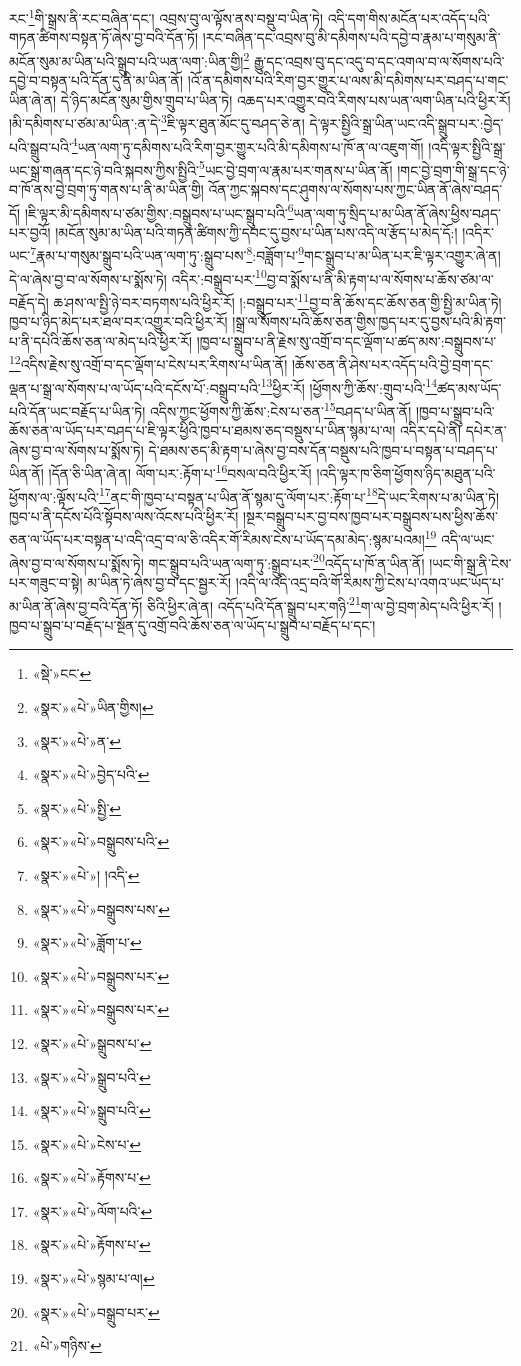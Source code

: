 རང་\footnote{«སྡེ་»ངང་}གི་སྒྲས་ནི་རང་བཞིན་དང་། འབྲས་བུ་ལ་ལྟོས་ནས་བསྡུ་བ་ཡིན་ཏེ། འདི་དག་གིས་མངོན་པར་འདོད་པའི་གཏན་ཚིགས་བསྟན་ཏོ་ཞེས་བྱ་བའི་དོན་ཏོ། །རང་བཞིན་དང་འབྲས་བུ་མི་དམིགས་པའི་དབྱེ་བ་རྣམ་པ་གསུམ་ནི་མངོན་སུམ་མ་ཡིན་པའི་སྒྲུབ་པའི་ཡན་ལག་:ཡིན་གྱི།\footnote{«སྣར་»«པེ་»ཡིན་གྱིས།} རྒྱུ་དང་འབྲས་བུ་དང་འདུ་བ་དང་འགལ་བ་ལ་སོགས་པའི་དབྱེ་བ་བསྟན་པའི་དོན་དུ་ནི་མ་ཡིན་ནོ། །འོ་ན་དམིགས་པའི་རིག་བྱར་གྱུར་པ་ལས་མི་དམིགས་པར་བཤད་པ་གང་ཡིན་ཞེ་ན། དེ་ཉིད་མངོན་སུམ་གྱིས་གྲུབ་པ་ཡིན་ཏེ། འཆད་པར་འགྱུར་བའི་རིགས་པས་ཡན་ལག་ཡིན་པའི་ཕྱིར་རོ། །མི་དམིགས་པ་ཙམ་མ་ཡིན་:ན་དེ་\footnote{«སྣར་»«པེ་»ན་}ཇི་ལྟར་ཐུན་མོང་དུ་བཤད་ཅེ་ན། དེ་ལྟར་སྤྱིའི་སྒྲ་ཡིན་ཡང་འདི་སྒྲུབ་པར་:བྱེད་པའི་སྒྲུབ་པའི་\footnote{«སྣར་»«པེ་»བྱེད་པའི་}ཡན་ལག་ཏུ་དམིགས་པའི་རིག་བྱར་གྱུར་པའི་མི་དམིགས་པ་ཁོ་ན་ལ་འཇུག་གོ། །འདི་ལྟར་སྤྱིའི་སྒྲ་ཡང་སྒྲ་གཞན་དང་ཉེ་བའི་སྐབས་ཀྱིས་སྤྱིའི་\footnote{«སྣར་»«པེ་»སྤྱི་}ཡང་བྱེ་བྲག་ལ་རྣམ་པར་གནས་པ་ཡིན་ནོ། །གང་བྱེ་བྲག་གི་སྒྲ་དང་ཉེ་བ་ཁོ་ནས་བྱེ་བྲག་ཏུ་གནས་པ་ནི་མ་ཡིན་གྱི། འོན་ཀྱང་སྐབས་དང་ཤུགས་ལ་སོགས་པས་ཀྱང་ཡིན་ནོ་ཞེས་བཤད་དོ། །ཇི་ལྟར་མི་དམིགས་པ་ཙམ་གྱིས་:བསྒྲུབས་པ་ཡང་སྒྲུབ་པའི་\footnote{«སྣར་»«པེ་»བསྒྲུབས་པའི་}ཡན་ལག་ཏུ་སྲིད་པ་མ་ཡིན་ནོ་ཞེས་ཕྱིས་བཤད་པར་བྱའོ། །མངོན་སུམ་མ་ཡིན་པའི་གཏན་ཚིགས་ཀྱི་དབང་དུ་བྱས་པ་ཡིན་པས་འདི་ལ་རྩོད་པ་མེད་དོ:། །འདིར་ཡང་\footnote{«སྣར་»«པེ་»། །འདི་}རྣམ་པ་གསུམ་སྒྲུབ་པའི་ཡན་ལག་ཏུ་:སྒྲུབ་པས་\footnote{«སྣར་»«པེ་»བསྒྲུབས་པས་}:བཟློག་པ་\footnote{«སྣར་»«པེ་»ཟློག་པ་}གང་སྒྲུབ་པ་མ་ཡིན་པར་ཇི་ལྟར་འགྱུར་ཞེ་ན། དེ་ལ་ཞེས་བྱ་བ་ལ་སོགས་པ་སྨོས་ཏེ། འདིར་:བསྒྲུབ་པར་\footnote{«སྣར་»«པེ་»བསྒྲུབས་པར་}བྱ་བ་སྨོས་པ་ནི་མི་རྟག་པ་ལ་སོགས་པ་ཆོས་ཙམ་ལ་བརྗོད་དེ། ཆ་ཤས་ལ་སྤྱི་ཉེ་བར་བཏགས་པའི་ཕྱིར་རོ། །:བསྒྲུབ་པར་\footnote{«སྣར་»«པེ་»བསྒྲུབས་པར་}བྱ་བ་ནི་ཆོས་དང་ཆོས་ཅན་གྱི་སྤྱི་མ་ཡིན་ཏེ། ཁྱབ་པ་ཉིད་མེད་པར་ཐལ་བར་འགྱུར་བའི་ཕྱིར་རོ། །སྒྲ་ལ་སོགས་པའི་ཆོས་ཅན་གྱིས་ཁྱད་པར་དུ་བྱས་པའི་མི་རྟག་པ་ནི་དཔེའི་ཆོས་ཅན་ལ་མེད་པའི་ཕྱིར་རོ། །ཁྱབ་པ་སྒྲུབ་པ་ནི་རྗེས་སུ་འགྲོ་བ་དང་ལྡོག་པ་ཚད་མས་:བསྒྲུབས་པ་\footnote{«སྣར་»«པེ་»སྒྲུབས་པ་}འདིས་རྗེས་སུ་འགྲོ་བ་དང་ལྡོག་པ་ངེས་པར་རིགས་པ་ཡིན་ནོ། །ཆོས་ཅན་ནི་ཤེས་པར་འདོད་པའི་བྱེ་བྲག་དང་ལྡན་པ་སྒྲ་ལ་སོགས་པ་ལ་ཡོད་པའི་དངོས་པོ་:བསྒྲུབ་པའི་\footnote{«སྣར་»«པེ་»སྒྲུབ་པའི་}ཕྱིར་རོ། །ཕྱོགས་ཀྱི་ཆོས་:གྲུབ་པའི་\footnote{«སྣར་»«པེ་»སྒྲུབ་པའི་}ཚད་མས་ཡོད་པའི་དོན་ཡང་བརྗོད་པ་ཡིན་ཏེ། འདིས་ཀྱང་ཕྱོགས་ཀྱི་ཆོས་:ངེས་པ་ཅན་\footnote{«སྣར་»«པེ་»ངེས་པ་}བཤད་པ་ཡིན་ནོ། །ཁྱབ་པ་སྒྲུབ་པའི་ཆོས་ཅན་ལ་ཡོད་པར་བཤད་པ་ཇི་ལྟར་ཕྱིའི་ཁྱབ་པ་ཐམས་ཅད་བསྡུས་པ་ཡིན་སྙམ་པ་ལ། འདིར་དཔེ་ནི། དཔེར་ན་ཞེས་བྱ་བ་ལ་སོགས་པ་སྨོས་ཏེ། དེ་ཐམས་ཅད་མི་རྟག་པ་ཞེས་བྱ་བས་དོན་བསྡུས་པའི་ཁྱབ་པ་བསྟན་པ་བཤད་པ་ཡིན་ནོ། །དོན་ཅི་ཡིན་ཞེ་ན། ལོག་པར་:རྟོག་པ་\footnote{«སྣར་»«པེ་»རྟོགས་པ་}བསལ་བའི་ཕྱིར་རོ། །འདི་ལྟར་ཁ་ཅིག་ཕྱོགས་ཉིད་མཐུན་པའི་ཕྱོགས་ལ་:ལྟོས་པའི་\footnote{«སྣར་»«པེ་»ལོག་པའི་}ནང་གི་ཁྱབ་པ་བསྟན་པ་ཡིན་ནོ་སྙམ་དུ་ལོག་པར་:རྟོག་པ་\footnote{«སྣར་»«པེ་»རྟོགས་པ་}དེ་ཡང་རིགས་པ་མ་ཡིན་ཏེ། ཁྱབ་པ་ནི་དངོས་པོའི་སྟོབས་ལས་འོངས་པའི་ཕྱིར་རོ། །སྔར་བསྒྲུབ་པར་བྱ་བས་ཁྱབ་པར་བསྒྲུབས་པས་ཕྱིས་ཆོས་ཅན་ལ་ཡོད་པར་བསྟན་པ་འདི་འདྲ་བ་ལ་ཅི་འདིར་གོ་རིམས་ངེས་པ་ཡོད་དམ་མེད་:སྙམ་པའམ།\footnote{«སྣར་»«པེ་»སྙམ་པ་ལ།} འདི་ལ་ཡང་ཞེས་བྱ་བ་ལ་སོགས་པ་སྨོས་ཏེ། གང་སྒྲུབ་པའི་ཡན་ལག་ཏུ་:སྒྲུབ་པར་\footnote{«སྣར་»«པེ་»བསྒྲུབ་པར་}འདོད་པ་ཁོ་ན་ཡིན་ནོ། །ཡང་གི་སྒྲ་ནི་ངེས་པར་གཟུང་བ་སྟེ། མ་ཡིན་ཏེ་ཞེས་བྱ་བ་དང་སྦྱར་རོ། །འདི་ལ་འདི་འདྲ་བའི་གོ་རིམས་ཀྱི་ངེས་པ་འགའ་ཡང་ཡོད་པ་མ་ཡིན་ནོ་ཞེས་བྱ་བའི་དོན་ཏོ། ཅིའི་ཕྱིར་ཞེ་ན། འདོད་པའི་དོན་སྒྲུབ་པར་གཉི་\footnote{«པེ་»གཉིས་}ག་ལ་བྱེ་བྲག་མེད་པའི་ཕྱིར་རོ། །ཁྱབ་པ་སྒྲུབ་པ་བརྗོད་པ་སྔོན་དུ་འགྲོ་བའི་ཆོས་ཅན་ལ་ཡོད་པ་སྒྲུབ་པ་བརྗོད་པ་དང་། 